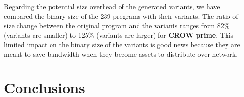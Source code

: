 Regarding the potential size overhead of the generated variants, we have compared the \wasm binary size of the 239 programs with their variants. The ratio of size change between the original program and the variants ranges from 82\% (variants are smaller) to 125\% (variants are larger) for \textbf{CROW prime}. This limited impact on the binary size of the variants is good news because they are meant to save bandwidth when they become assets to distribute over network.


\section{Conclusions}

\todo{}